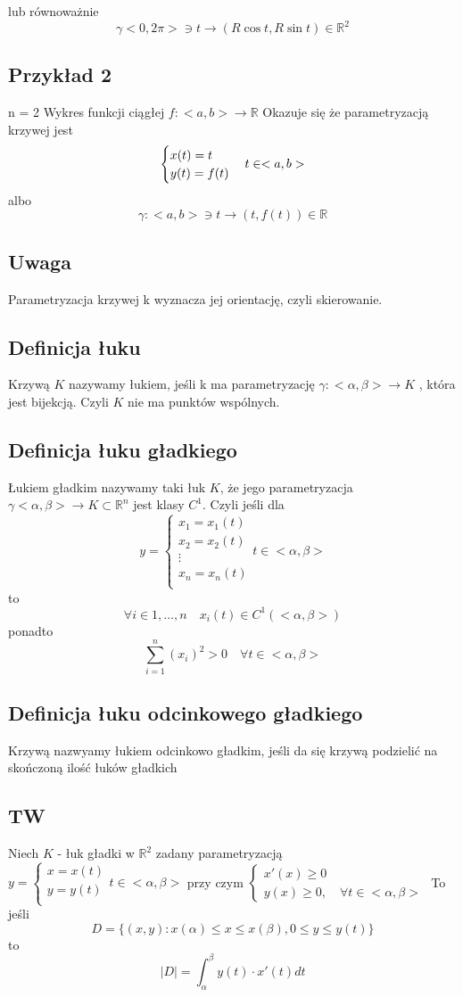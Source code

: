 \documentclass[11pt]{article}
\begin{document}
lub równoważnie
$$\gamma <0,2\pi> \ni t \to (R \cos{t}, R \sin{t}) \in \mathbb{R}^2$$

\subsection{Przykład 2}
n = 2
Wykres funkcji ciągłej $f : <a,b> \to \mathbb{R}$
Okazuje się że parametryzacją krzywej jest 
$$
\begin{cases}
x(t) = t \\
y(t) = f(t) \\
\end{cases}
\\
t \in <a,b>$$
albo
$$ \gamma : <a,b> \ni t \to (t,f(t)) \in \mathbb{R}$$
\subsection{Uwaga}
Parametryzacja krzywej k wyznacza jej orientację, czyli skierowanie.
\subsection{Definicja łuku}
Krzywą $K$ nazywamy łukiem, jeśli k ma parametryzację $\gamma : <\alpha,\beta> \to K$ , która jest bijekcją. Czyli $K$ nie ma punktów wspólnych.
\subsection{Definicja łuku gładkiego}
Łukiem gładkim nazywamy taki łuk $K$, że jego parametryzacja $ \gamma <\alpha,\beta> \to K \subset \mathbb{R}^n$ jest klasy $C^1$. Czyli jeśli dla 
$$ y = 
\begin{cases}
x_1 = x_1(t)\\
x_2 = x_2(t)\\
\vdots	\\
x_n = x_n(t)\\
\end{cases}
t \in <\alpha,\beta>$$
to $$ \forall i \in{1,\ldots,n} \quad x_i(t) \in C^1(<\alpha,\beta>)$$
ponadto 
$$ \sum_{i=1}^n (x_i)^2 > 0 \quad \forall t\in <\alpha,\beta>$$
\subsection{Definicja łuku odcinkowego gładkiego}
Krzywą nazwyamy łukiem odcinkowo gładkim, jeśli da się krzywą podzielić na skończoną ilość łuków gładkich
\subsection{TW}
Niech $K$ - łuk gładki w $\mathbb{R}^2$ zadany parametryzacją 
$ y = 
\begin{cases}
x = x(t)\\
y = y(t)\\
\end{cases}
t \in <\alpha,\beta>$ przy czym $
\begin{cases}
x'(x) \geq 0\\
y(x) \geq 0, \quad \forall t \in <\alpha,\beta>
\end{cases}$
To jeśli $$D = \{ (x,y) : x(\alpha)\leq x \leq x(\beta), 0\leq y \leq y(t) \}$$
to 
$$ |D| = \int_{\alpha}^{\beta} y(t) \cdot x'(t) dt $$
\end{document}
